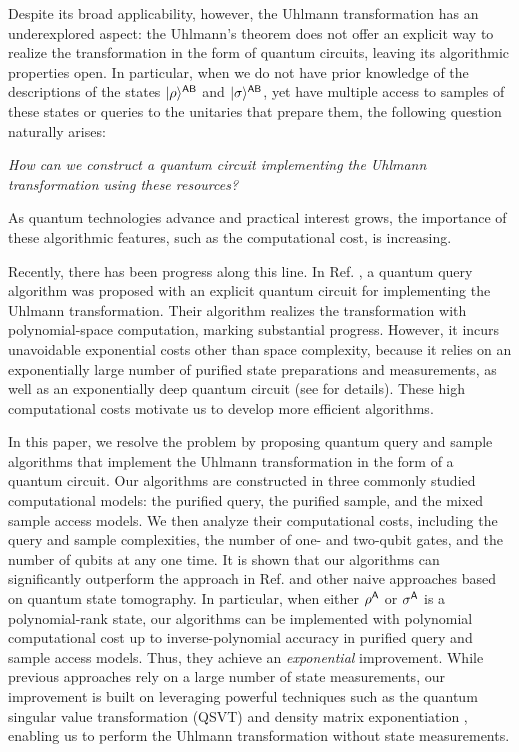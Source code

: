 Despite its broad applicability, however, the Uhlmann transformation has an underexplored aspect: the Uhlmann's theorem does not offer an explicit way to realize the transformation in the form of quantum circuits, leaving its algorithmic properties open.
In particular, when we do not have prior knowledge of the descriptions of the states $|\rho\rangle^{{\mathsf{A}}{\mathsf{B}}}$ and $|\sigma\rangle^{{\mathsf{A}}{\mathsf{B}}}$, yet have multiple access to samples of these states or queries to the unitaries that prepare them, the following question naturally arises:
\begin{center}
\emph{How can we construct a quantum circuit implementing the Uhlmann transformation using these resources?}
\end{center}
As quantum technologies advance and practical interest grows, the importance of these algorithmic features, such as the computational cost, is increasing.



Recently, there has been progress along this line.
In Ref. \cite{metger2023stateqipspace}, a quantum query algorithm was proposed with an explicit quantum circuit for implementing the Uhlmann transformation. Their algorithm realizes the transformation with polynomial-space computation, marking substantial progress. 
However, it incurs unavoidable exponential costs other than space complexity, because it relies on an exponentially large number of purified state preparations and measurements, as well as an exponentially deep quantum circuit (see  for details).
These high computational costs motivate us to develop more efficient algorithms.


In this paper, we resolve the problem by proposing quantum query and sample algorithms that implement the Uhlmann transformation in the form of a quantum circuit.
Our algorithms are constructed in three commonly studied computational models: the purified query, the purified sample, and the mixed sample access models.
We then analyze their computational costs, including the query and sample complexities, the number of one- and two-qubit gates, and the number of qubits at any one time.
It is shown that our algorithms can significantly outperform the approach in Ref. \cite{metger2023stateqipspace} and other naive approaches based on quantum state tomography.
In particular, when either $\rho^{\mathsf{A}}$ or $\sigma^{\mathsf{A}}$ is a polynomial-rank state, our algorithms can be implemented with polynomial computational cost up to inverse-polynomial accuracy in purified query and sample access models.
Thus, they achieve an \emph{exponential} improvement.
While previous approaches rely on a large number of state measurements, our improvement is built on leveraging powerful techniques such as the quantum singular value transformation (QSVT) \cite{gilyen2019qsvt, Gilyn2019thesis} and density matrix exponentiation \cite{lloyd2014QuantPrincCompAnaly}, enabling us to perform the Uhlmann transformation without state measurements.




